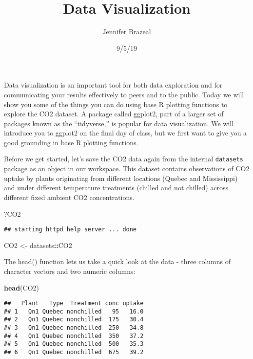 \documentclass[]{article}
\title{Data Visualization}
\author{Jennifer Brazeal}
\date{9/5/19}
\newenvironment{Shaded}{\begin{snugshade}}{\end{snugshade}}
\newcommand{\KeywordTok}[1]{\textcolor[rgb]{0.13,0.29,0.53}{\textbf{#1}}}
\newcommand{\NormalTok}[1]{#1}
\newcommand{\OperatorTok}[1]{\textcolor[rgb]{0.81,0.36,0.00}{\textbf{#1}}}
\newcommand{\StringTok}[1]{\textcolor[rgb]{0.31,0.60,0.02}{#1}}
\begin{document}
\maketitle

Data visualization is an important tool for both data exploration and
for communicating your results effectively to peers and to the public.
Today we will show you some of the things you can do using base R
plotting functions to explore the CO2 dataset. A package called ggplot2,
part of a larger set of packages known as the ``tidyverse,'' is popular
for data visualization. We will introduce you to ggplot2 on the final
day of class, but we first want to give you a good grounding in base R
plotting functions.

Before we get started, let's save the CO2 data again from the internal
\texttt{datasets} package as an object in our workspace. This dataset
contains observations of CO2 uptake by plants originating from different
locations (Quebec and Mississippi) and under different temperature
treatments (chilled and not chilled) across different fixed ambient CO2
concentrations.

\begin{Shaded}
\begin{Highlighting}[]
\NormalTok{?CO2}
\end{Highlighting}
\end{Shaded}

\begin{verbatim}
## starting httpd help server ... done
\end{verbatim}

\begin{Shaded}
\begin{Highlighting}[]
\NormalTok{CO2 <-}\StringTok{ }\NormalTok{datasets}\OperatorTok{::}\NormalTok{CO2}
\end{Highlighting}
\end{Shaded}

The head() function lets us take a quick look at the data - three
columns of character vectors and two numeric columns:

\begin{Shaded}
\begin{Highlighting}[]
\KeywordTok{head}\NormalTok{(CO2)}
\end{Highlighting}
\end{Shaded}

\begin{verbatim}
##   Plant   Type  Treatment conc uptake
## 1   Qn1 Quebec nonchilled   95   16.0
## 2   Qn1 Quebec nonchilled  175   30.4
## 3   Qn1 Quebec nonchilled  250   34.8
## 4   Qn1 Quebec nonchilled  350   37.2
## 5   Qn1 Quebec nonchilled  500   35.3
## 6   Qn1 Quebec nonchilled  675   39.2
\end{verbatim}
\end{document}
